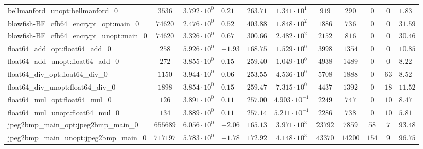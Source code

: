 \begin{tabular}{|l|c|HHc|c|c|c|c|cH|}
bellmanford\_unopt:bellmanford\_0               & $ 3536     $ & $ 3.792 \cdot 10^{0} $ & $ 0.21  $ & $ 263.71 $ & $ 1.341 \cdot 10^{1}  $ & $ 919    $ & $ 290   $ & $ 0   $ & $ 0   $ & $ 1.83    $ \\
blowfish-BF\_cfb64\_encrypt\_opt:main\_0        & $ 74620    $ & $ 2.476 \cdot 10^{0} $ & $ 0.52  $ & $ 403.88 $ & $ 1.848 \cdot 10^{2}  $ & $ 1886   $ & $ 736   $ & $ 0   $ & $ 0   $ & $ 31.59   $ \\
blowfish-BF\_cfb64\_encrypt\_unopt:main\_0      & $ 74620    $ & $ 3.326 \cdot 10^{0} $ & $ 0.67  $ & $ 300.66 $ & $ 2.482 \cdot 10^{2}  $ & $ 2152   $ & $ 816   $ & $ 0   $ & $ 0   $ & $ 30.46   $ \\
float64\_add\_opt:float64\_add\_0               & $ 258      $ & $ 5.926 \cdot 10^{0} $ & $ -1.93 $ & $ 168.75 $ & $ 1.529 \cdot 10^{0}  $ & $ 3998   $ & $ 1354  $ & $ 0   $ & $ 0   $ & $ 10.85   $ \\
float64\_add\_unopt:float64\_add\_0             & $ 272      $ & $ 3.855 \cdot 10^{0} $ & $ 0.15  $ & $ 259.40 $ & $ 1.049 \cdot 10^{0}  $ & $ 4938   $ & $ 1489  $ & $ 0   $ & $ 0   $ & $ 8.22    $ \\
float64\_div\_opt:float64\_div\_0               & $ 1150     $ & $ 3.944 \cdot 10^{0} $ & $ 0.06  $ & $ 253.55 $ & $ 4.536 \cdot 10^{0}  $ & $ 5708   $ & $ 1888  $ & $ 0   $ & $ 63  $ & $ 8.52    $ \\
float64\_div\_unopt:float64\_div\_0             & $ 1898     $ & $ 3.854 \cdot 10^{0} $ & $ 0.15  $ & $ 259.47 $ & $ 7.315 \cdot 10^{0}  $ & $ 4437   $ & $ 1392  $ & $ 0   $ & $ 18  $ & $ 11.52   $ \\
float64\_mul\_opt:float64\_mul\_0               & $ 126      $ & $ 3.891 \cdot 10^{0} $ & $ 0.11  $ & $ 257.00 $ & $ 4.903 \cdot 10^{-1} $ & $ 2249   $ & $ 747   $ & $ 0   $ & $ 10  $ & $ 8.47    $ \\
float64\_mul\_unopt:float64\_mul\_0             & $ 134      $ & $ 3.889 \cdot 10^{0} $ & $ 0.11  $ & $ 257.14 $ & $ 5.211 \cdot 10^{-1} $ & $ 2286   $ & $ 738   $ & $ 0   $ & $ 10  $ & $ 5.81    $ \\
jpeg2bmp\_main\_opt:jpeg2bmp\_main\_0           & $ 655689   $ & $ 6.056 \cdot 10^{0} $ & $ -2.06 $ & $ 165.13 $ & $ 3.971 \cdot 10^{3}  $ & $ 23792  $ & $ 7859  $ & $ 58  $ & $ 7   $ & $ 93.48   $ \\
jpeg2bmp\_main\_unopt:jpeg2bmp\_main\_0         & $ 717197   $ & $ 5.783 \cdot 10^{0} $ & $ -1.78 $ & $ 172.92 $ & $ 4.148 \cdot 10^{3}  $ & $ 43370  $ & $ 14200 $ & $ 154 $ & $ 9   $ & $ 96.75   $ \\

\end{tabular}
